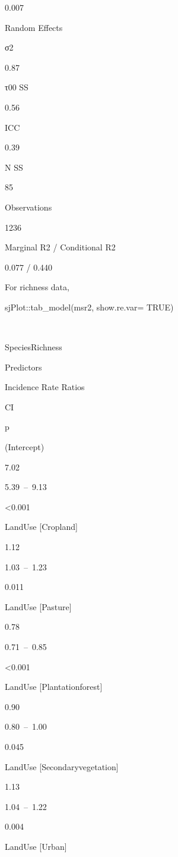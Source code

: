 \documentclass[
]{article}
\newenvironment{Shaded}{\begin{snugshade}}{\end{snugshade}}
\newcommand{\AttributeTok}[1]{\textcolor[rgb]{0.77,0.63,0.00}{#1}}
\newcommand{\ConstantTok}[1]{\textcolor[rgb]{0.00,0.00,0.00}{#1}}
\newcommand{\FunctionTok}[1]{\textcolor[rgb]{0.00,0.00,0.00}{#1}}
\newcommand{\NormalTok}[1]{#1}
\newcommand{\SpecialCharTok}[1]{\textcolor[rgb]{0.00,0.00,0.00}{#1}}
\begin{document}
0.007

Random Effects

σ2

0.87

τ00 SS

0.56

ICC

0.39

N SS

85

Observations

1236

Marginal R2 / Conditional R2

0.077 / 0.440

For richness data,

\begin{Shaded}
\begin{Highlighting}[]
\NormalTok{sjPlot}\SpecialCharTok{::}\FunctionTok{tab\_model}\NormalTok{(msr2, }
                  \AttributeTok{show.re.var=} \ConstantTok{TRUE}\NormalTok{)}
\end{Highlighting}
\end{Shaded}

~

SpeciesRichness

Predictors

Incidence Rate Ratios

CI

p

(Intercept)

7.02

5.39~--~9.13

\textless0.001

LandUse {[}Cropland{]}

1.12

1.03~--~1.23

0.011

LandUse {[}Pasture{]}

0.78

0.71~--~0.85

\textless0.001

LandUse {[}Plantationforest{]}

0.90

0.80~--~1.00

0.045

LandUse {[}Secondaryvegetation{]}

1.13

1.04~--~1.22

0.004

LandUse {[}Urban{]}
\end{document}
